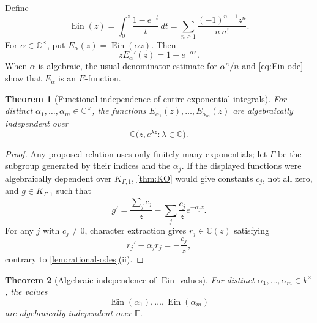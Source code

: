 \documentclass[11pt]{article}
\numberwithin{equation}{section}
\newtheorem{theorem}{Theorem}[section]
\theoremstyle{definition}
\theoremstyle{remark}
\newcommand{\C}{\mathbb C}
\newcommand{\Ein}{\operatorname{Ein}}
\begin{document}
Define
\begin{equation}\label{eq:Ein}
  \Ein(z)=\int_0^z\frac{1-e^{-t}}{t}\,dt
  =\sum_{n\ge1}\frac{(-1)^{n-1}z^n}{n\,n!}.
\end{equation}
For $\alpha\in\C^\times$, put $E_\alpha(z)=\Ein(\alpha z)$.  Then
\begin{equation}\label{eq:Ein-ode}
  zE_\alpha'(z)=1-e^{-\alpha z}.
\end{equation}
When $\alpha$ is algebraic, the usual denominator estimate for
$\alpha^n/n$ and \eqref{eq:Ein-ode} show that $E_\alpha$ is an $E$-function.

\begin{theorem}[Functional independence of entire exponential integrals]
\label{thm:Ein-functional}
For distinct $\alpha_1,\ldots,\alpha_m\in\C^\times$, the functions
$E_{\alpha_1}(z),\ldots,E_{\alpha_m}(z)$ are algebraically independent over
\[
  \C\bigl(z,e^{\lambda z}:\lambda\in\C\bigr).
\]
\end{theorem}

\begin{proof}
Any proposed relation uses only finitely many exponentials; let $\Gamma$ be
the subgroup generated by their indices and the $\alpha_j$.  If the displayed
functions were algebraically dependent over $K_{\Gamma,1}$,
\cref{thm:KO} would give constants $c_j$, not all zero, and
$g\in K_{\Gamma,1}$ such that
\[
  g'=\frac{\sum_jc_j}{z}
     -\sum_j\frac{c_j}{z}e^{-\alpha_jz}.
\]
For any $j$ with $c_j\ne0$, character extraction gives
$r_j\in\C(z)$ satisfying
\[
  r_j'-\alpha_jr_j=-\frac{c_j}{z},
\]
contrary to \cref{lem:rational-odes}(ii).
\end{proof}

\begin{theorem}[Algebraic independence of $\Ein$-values]
\label{thm:Ein-values}
For distinct $\alpha_1,\ldots,\alpha_m\in k^\times$, the values
\[
  \Ein(\alpha_1),\ldots,\Ein(\alpha_m)
\]
are algebraically independent over $\mathbb E$.
\end{theorem}
\end{document}
